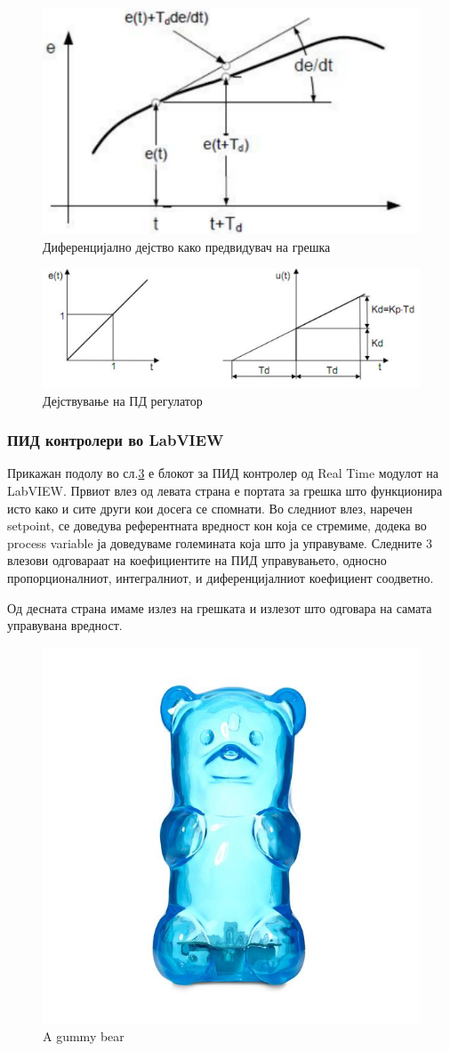 \documentclass{article}
\begin{document}
\begin{figure}[H]
\includegraphics[width=0.3\linewidth]{el_8.png}
\centering
\caption{Диференцијално дејство како предвидувач на грешка}
\label{fig:el_8.png}
\end{figure}

\begin{figure}[H]
\includegraphics[width=0.3\linewidth]{el_9.png}
\centering
\caption{Дејствување на ПД регулатор}
\label{fig:el_9.png}
\end{figure}



\subsubsection{ПИД контролери во LabVIEW}

Прикажан подолу во сл.\ref{fig:gummy_boi.jpg} е блокот за ПИД контролер од Real Time модулот на LabVIEW. Првиот влез од левата страна е портата за грешка што функционира исто како и сите други кои досега се спомнати. Во следниот влез, наречен setpoint, се доведува референтната вредност кон која се стремиме, додека во process variable ја доведуваме големината која што ја управуваме. Следните 3 влезови одговараат на коефициентите на ПИД управувањето, односно пропорционалниот, интегралниот, и диференцијалниот коефициент соодветно.

Од десната страна имаме излез на грешката и излезот што одговара на самата управувана вредност.

\begin{figure}[H]
\includegraphics[width=0.5\linewidth]{gummy_boi.jpg}
\centering
\caption{A gummy bear}
\label{fig:gummy_boi.jpg}
\end{figure}
\end{document}
